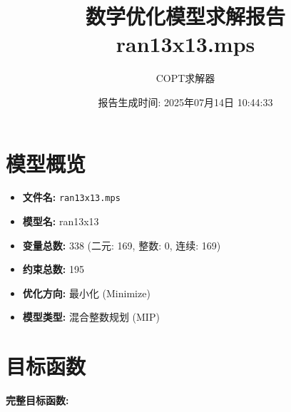 \documentclass[a4paper,10pt]{article}
\title{数学优化模型求解报告\\{\large ran13x13.mps}}
\author{COPT求解器}
\date{报告生成时间: 2025年07月14日 10:44:33}
\begin{document}
\maketitle
\tableofcontents
\newpage

\section{模型概览}
\begin{itemize}
    \item \textbf{文件名:} \texttt{ran13x13.mps}
    \item \textbf{模型名:} ran13x13
    \item \textbf{变量总数:} 338 (二元: 169, 整数: 0, 连续: 169)
    \item \textbf{约束总数:} 195
    \item \textbf{优化方向:} 最小化 (Minimize)
    \item \textbf{模型类型:} 混合整数规划 (MIP)
\end{itemize}
\section{目标函数}

\textbf{完整目标函数:}
\end{document}
